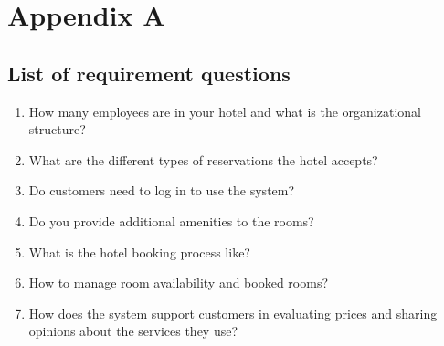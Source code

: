 \chapter*{Appendix A}
\section*{List of requirement questions}
\begin{enumerate}
    \item How many employees are in your hotel and what is the organizational structure?
    \item What are the different types of reservations the hotel accepts?
    \item Do customers need to log in to use the system?
    \item Do you provide additional amenities to the rooms?
    \item What is the hotel booking process like?
    \item How to manage room availability and booked rooms?
    \item How does the system support customers in evaluating prices and sharing opinions about the services they use?
\end{enumerate}
